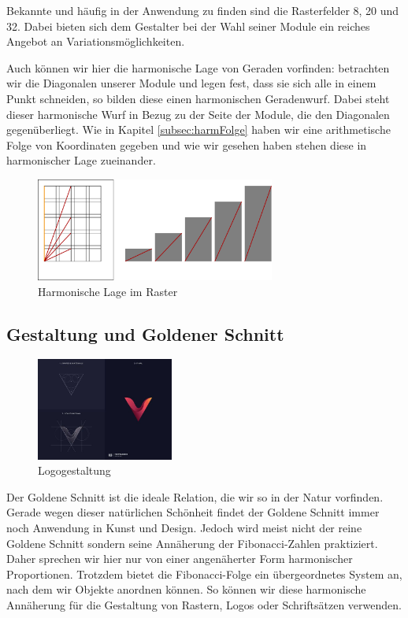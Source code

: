 \documentclass[12pt,a4paper]{article}
\begin{document}
Bekannte und häufig in der Anwendung zu finden sind die Rasterfelder 8, 20 und 32.  Dabei bieten sich dem Gestalter bei der Wahl seiner Module ein reiches Angebot an Variationsmöglichkeiten.

Auch können wir hier die harmonische Lage von Geraden vorfinden: betrachten wir die Diagonalen unserer Module und legen fest, dass sie sich alle in einem Punkt schneiden, so bilden diese einen harmonischen Geradenwurf. Dabei steht dieser harmonische Wurf in Bezug zu der Seite der Module, die den Diagonalen gegenüberliegt. Wie in Kapitel \ref{subsec:harmFolge} haben wir eine arithmetische Folge von Koordinaten gegeben und wie wir gesehen haben stehen diese in harmonischer Lage zueinander.

\begin{figure}[htbp]
\centering
\includegraphics[width=0.7\textwidth]{Bilder/raster.png}
\caption{Harmonische Lage im Raster}
\label{fig:raster}
\end{figure}

\subsection{Gestaltung und Goldener Schnitt}

\begin{figure}
\includegraphics[width=0.4\textwidth]{Bilder/gr_logo.jpg} %
\caption{Logogestaltung}
\end{figure}

Der Goldene Schnitt ist die ideale Relation, die wir so in der Natur vorfinden. Gerade wegen dieser natürlichen Schönheit findet der Goldene Schnitt immer noch Anwendung in Kunst und Design. Jedoch wird meist nicht der reine Goldene Schnitt sondern seine Annäherung der Fibonacci-Zahlen praktiziert. Daher sprechen wir hier nur von einer angenäherter Form harmonischer Proportionen. Trotzdem bietet die Fibonacci-Folge ein übergeordnetes System an, nach dem wir Objekte anordnen können. So können wir diese harmonische Annäherung für die Gestaltung von Rastern, Logos oder Schriftsätzen verwenden.
\end{document}
